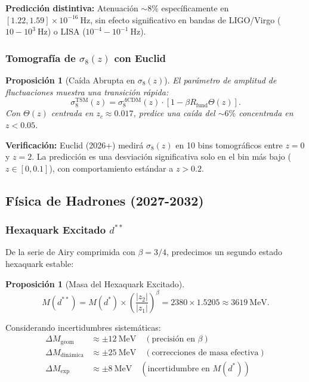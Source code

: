 \documentclass[11pt, a4paper]{article}
\theoremstyle{plain}
\newtheorem{proposicion}[teorema]{Proposición}
\theoremstyle{definition}
\newcommand{\Rfactor}{R_{\text{fund}}}
\begin{document}
\textbf{Predicción distintiva:} Atenuación $\sim 8\%$ específicamente en $[1.22, 1.59] \times 10^{-16}\ \si{\hertz}$, sin efecto significativo en bandas de LIGO/Virgo ($10-10^3\ \si{\hertz}$) o LISA ($10^{-4}-10^{-1}\ \si{\hertz}$).

\subsubsection{Tomografía de \texorpdfstring{$\sigma_8(z)$}{sigma8(z)} con Euclid}

\begin{proposicion}[Caída Abrupta en $\sigma_8(z)$]
El parámetro de amplitud de fluctuaciones muestra una transición rápida:
\begin{equation}
\sigma_8^{\text{TSM}}(z) = \sigma_8^{\Lambda\text{CDM}}(z) \cdot \left[1 - \beta\Rfactor \Theta(z)\right].
\end{equation}
Con $\Theta(z)$ centrada en $z_c \approx 0.017$, predice una caída del $\sim 6\%$ concentrada en $z < 0.05$.
\end{proposicion}

\textbf{Verificación:} Euclid (2026+) medirá $\sigma_8(z)$ en 10 bins tomográficos entre $z=0$ y $z=2$. La predicción es una desviación significativa solo en el bin más bajo ($z \in [0, 0.1]$), con comportamiento estándar a $z > 0.2$.

\subsection{Física de Hadrones (2027-2032)}

\subsubsection{Hexaquark Excitado \texorpdfstring{$d^{**}$}{d**}}

De la serie de Airy comprimida con $\beta = 3/4$, predecimos un segundo estado hexaquark estable:

\begin{proposicion}[Masa del Hexaquark Excitado]
\begin{equation}
M(d^{**}) = M(d^*) \times \left(\frac{|z_2|}{|z_1|}\right)^\beta = 2380 \times 1.5205 \approx 3619\ \si{\mega\electronvolt}.
\end{equation}
\end{proposicion}

Considerando incertidumbres sistemáticas:
\begin{align*}
\Delta M_{\text{geom}} &\approx \pm 12\ \si{\mega\electronvolt} \quad (\text{precisión en } \beta) \\
\Delta M_{\text{dinámica}} &\approx \pm 25\ \si{\mega\electronvolt} \quad (\text{correcciones de masa efectiva}) \\
\Delta M_{\text{exp}} &\approx \pm 8\ \si{\mega\electronvolt} \quad (\text{incertidumbre en } M(d^*))
\end{align*}
\end{document}
